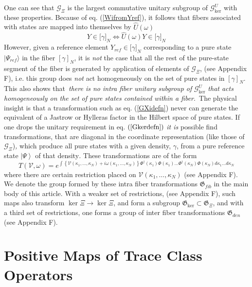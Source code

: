 \documentclass[aps,preprint]{revtex4}%
\begin{document}
One can see that $\mathcal{G}_{\Xi}$ is the largest commutative unitary
subgroup of $\mathcal{G}_{\ker}^{U}$ with these properties. Because of eq.
(\ref{WifromYref}), it follows that fibers associated with states are mapped
into themselves by $\hat{U}(\omega)$
\begin{equation}
Y\in\lbrack\gamma]_{N}\Leftrightarrow\hat{U}(\omega)Y\in\lbrack\gamma]_{N}%
\end{equation}
However, given a reference element $Y_{ref}\in\lbrack\gamma]_{N}$
corresponding to a pure state $|\Psi_{ref}\rangle$ in the fiber $[\gamma]_{N}%
$, it is \emph{not} the case that all the rest of the pure-state segment of
the fiber is generated by application of elements of $\mathcal{G}_{\Xi}$, (see
Appendix F), i.e. this group does \emph{not }act homogeneously on the set of
pure states in $[\gamma]_{N}$. This also shows that\emph{\ there is no intra
fiber unitary subgroup of }$\mathcal{G}_{\ker}^{U}$ \emph{that acts
homogeneously on the set of pure states contained within a fiber}.\emph{\ }The
physical insight is that a transformation such as eq. (\ref{GXidefn}) never
can generate the equivalent of a Jastrow or Hylleras factor in the Hilbert
space of pure states. If one drops the unitary requirement in eq. $\left(
\ref{Gkerdefn}\right)  $ \textit{it is} possible find transformations, that
are diagonal in the coordinate representation (like those of $\mathcal{G}%
_{\Xi}$)\textit{, }which produce all pure states with a given density,
$\gamma$, from a pure reference state $\left|  \Psi\right\rangle $ of that
density\textit{. }These transformations are of the form%
\begin{equation}
T\left(  \mathcal{V},\omega\right)  =e^{\int\left\{  \mathcal{V}(\kappa
_{1},\ldots,\kappa_{N})+i\omega(\kappa_{1},\ldots,\kappa_{N})\right\}
\Phi^{\dagger}(\kappa_{1})\Phi(\kappa_{1})\ldots\Phi^{\dagger}(\kappa_{N}%
)\Phi(\kappa_{N})d\kappa_{1}\ldots d\kappa_{N}}%
\end{equation}
where there are certain restriction placed on $\mathcal{V}(\kappa_{1}%
,\ldots,\kappa_{N})$ (see Appendix F). We denote the group formed by these
intra fiber transformations $\mathfrak{G}_{fib}$ in the main body of this
article. With a weaker set of restrictions, (see Appendix F), such maps also
transform $\ker\Xi\rightarrow\ker\Xi$, and form a subgroup $\mathfrak{G}%
_{\ker}\subset\mathfrak{G}_{\Xi}$, and with a third set of restrictions, one
forms a group of inter fiber transformations $\mathfrak{G}_{den}$ (see
Appendix F).

\section{Positive Maps of Trace Class Operators}
\end{document}
